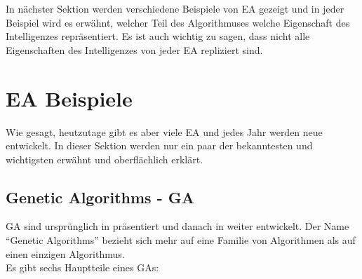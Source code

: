 \documentclass[twoside,twocolumn]{article}
\begin{document}
In nächster Sektion werden verschiedene Beispiele von EA gezeigt und in jeder Beispiel wird es erwähnt, welcher Teil des Algorithmuses welche Eigenschaft des Intelligenzes repräsentiert. Es ist auch wichtig zu sagen, dass nicht alle Eigenschaften des Intelligenzes von jeder EA repliziert sind.


\section{EA Beispiele}

Wie gesagt, heutzutage gibt es aber viele EA und jedes Jahr werden neue entwickelt. In dieser Sektion werden nur ein paar der bekanntesten und wichtigsten erwähnt und oberflächlich erklärt.

\subsection{Genetic Algorithms - GA}
GA sind ursprünglich in \cite{holland_ga} präsentiert und danach in \cite{goldberg_ga} weiter entwickelt. Der Name ``Genetic Algorithms'' bezieht sich mehr auf eine Familie von Algorithmen als auf einen einzigen Algorithmus.\\
Es gibt sechs Hauptteile eines GAs:
\end{document}
